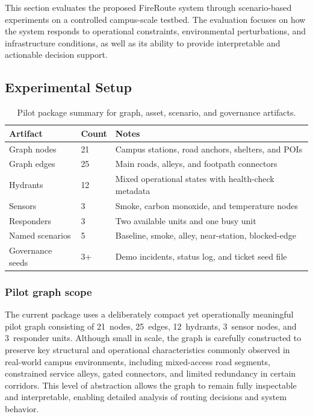This section evaluates the proposed FireRoute system through scenario-based experiments on a controlled campus-scale testbed. The evaluation focuses on how the system responds to operational constraints, environmental perturbations, and infrastructure conditions, as well as its ability to provide interpretable and actionable decision support.

\subsection{Experimental Setup}

\begin{table}[t]
\caption{Pilot package summary for graph, asset, scenario, and governance artifacts.}
\label{tab:assets}
\centering
\scriptsize
\setlength{\tabcolsep}{3.5pt}
\renewcommand{\arraystretch}{0.92}
\begin{tabular}{L{2.25cm} C{0.8cm} L{3.95cm}}
\toprule
Artifact & Count & Notes \\
\midrule
Graph nodes & 21 & Campus stations, road anchors, shelters, and POIs \\
Graph edges & 25 & Main roads, alleys, and footpath connectors \\
Hydrants & 12 & Mixed operational states with health-check metadata \\
Sensors & 3 & Smoke, carbon monoxide, and temperature nodes \\
Responders & 3 & Two available units and one busy unit \\
Named scenarios & 5 & Baseline, smoke, alley, near-station, blocked-edge \\
Governance seeds & 3+ & Demo incidents, status log, and ticket seed file \\
\bottomrule
\end{tabular}
\end{table}

\subsubsection{Pilot graph scope}
The current package uses a deliberately compact yet operationally meaningful pilot graph consisting of 21~nodes, 25~edges, 12~hydrants, 3~sensor nodes, and 3~responder units. Although small in scale, the graph is carefully constructed to preserve key structural and operational characteristics commonly observed in real-world campus environments, including mixed-access road segments, constrained service alleys, gated connectors, and limited redundancy in certain corridors. This level of abstraction allows the graph to remain fully inspectable and interpretable, enabling detailed analysis of routing decisions and system behavior.

